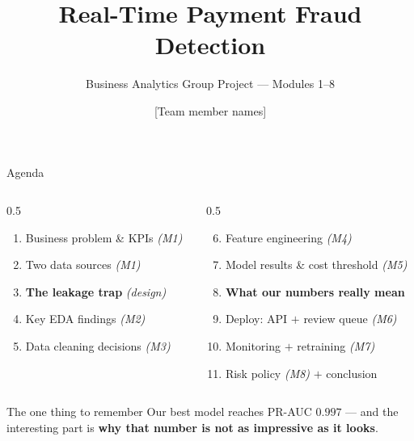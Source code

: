 \documentclass[aspectratio=169]{beamer}
\title[Fraud Detection]{Real-Time Payment Fraud Detection}
\subtitle{Business Analytics Group Project --- Modules 1--8}
\author[Team]{[Team member names]}
\institute[]{Business Analytics}
\date{}
\newcommand{\warn}[1]{\textcolor{hustdark}{\textbf{#1}}}
\begin{document}
\begin{frame}
\titlepage
\end{frame}

\begin{frame}{Agenda}
\begin{columns}[T]
\begin{column}{0.5\textwidth}
\begin{enumerate}
    \item Business problem \& KPIs \hfill \textit{(M1)}
    \item Two data sources \hfill \textit{(M1)}
    \item \warn{The leakage trap} \hfill \textit{(design)}
    \item Key EDA findings \hfill \textit{(M2)}
    \item Data cleaning decisions \hfill \textit{(M3)}
\end{enumerate}
\end{column}
\begin{column}{0.5\textwidth}
\begin{enumerate}
    \setcounter{enumi}{5}
    \item Feature engineering \hfill \textit{(M4)}
    \item Model results \& cost threshold \hfill \textit{(M5)}
    \item \warn{What our numbers really mean}
    \item Deploy: API $+$ review queue \hfill \textit{(M6)}
    \item Monitoring $+$ retraining \hfill \textit{(M7)}
    \item Risk policy \hfill \textit{(M8)} $+$ conclusion
\end{enumerate}
\end{column}
\end{columns}

\vspace{1em}
\begin{block}{The one thing to remember}
Our best model reaches PR-AUC $0.997$ --- and the interesting part is
\warn{why that number is not as impressive as it looks}.
\end{block}
\end{frame}
\end{document}
